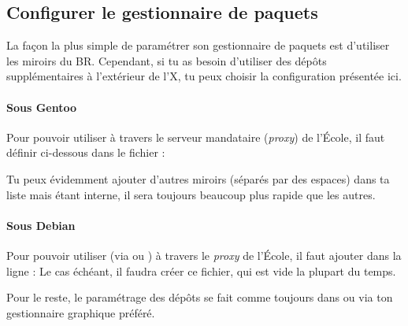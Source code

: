 \subsection{Configurer le gestionnaire de paquets}

La fa\c con la plus simple de paramétrer son gestionnaire de paquets est d'utiliser les miroirs du BR. Cependant, si tu as besoin d'utiliser des dépôts supplémentaires à l'extérieur de l'X, tu peux choisir
la configuration présentée ici.

\paragraph{Sous Gentoo}
\label{gentoo_mirror} Pour pouvoir utiliser  à  travers le serveur mandataire (\emph{proxy}) de l'École, il faut définir %
ci-dessous dans le fichier  :

Tu peux évidemment ajouter d'autres miroirs (séparés par des espaces) dans ta liste mais  étant interne, il sera toujours beaucoup plus rapide que les autres.



\paragraph{Sous Debian}
\label{debian_mirror} Pour pouvoir utiliser  (via  ou ) à travers le \emph{proxy} de l'École, il faut ajouter dans  la ligne :
Le cas échéant, il faudra créer ce fichier, qui est vide la plupart du temps.

Pour le reste, le paramétrage des dépôts se fait comme toujours dans  ou via ton gestionnaire graphique préféré.
